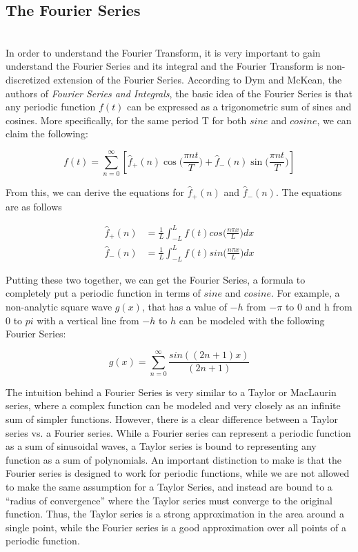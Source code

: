 \documentclass{amsproc}
\begin{document}
\subsection{The Fourier Series}

\mbox{}	\\
\indent In order to understand the Fourier Transform, it is very important to gain understand the Fourier Series and its integral and the Fourier Transform is non-discretized extension of the Fourier Series. According to Dym and McKean, the authors of \textit{Fourier Series and Integrals}, the basic idea of the Fourier Series is that any periodic function $f(t)$ can be expressed as a trigonometric sum of sines and cosines. More specifically, for the same period T for both $sine$ and $cosine$, we can claim the following:

$$
f(t) = \sum_{n = 0}^{\infty} [\hat f_+(n)\cos \Big(\frac{\pi n t}{T}\Big) + \hat f_-(n)\sin \Big(\frac{\pi n t}{T}\Big)]
$$

From this, we can derive the equations for $\hat f_+(n)$ and $\hat f_-(n)$. The equations are as follows \cite{Dym}

\begin{align*}
\hat f_+(n)  &= \frac{1}{L}\int_{-L}^{L} f(t) cos\Big(\frac{n\pi x}{L}\Big)dx \\
\hat f_-(n)  &= \frac{1}{L}\int_{-L}^{L} f(t) sin\Big(\frac{n\pi x}{L}\Big)dx
\end{align*}

Putting these two together, we can get the Fourier Series, a formula to completely put a periodic function in terms of $sine$ and $cosine$. For example, a non-analytic square wave $g(x)$, that has a value of $-h$ from $-\pi$ to $0$ and h from $0$ to $pi$ with a vertical line from $-h$ to $h$ can be modeled with the following Fourier Series:

$$
g(x) = \sum_{n = 0}^{\infty} \frac{sin((2n + 1)x)}{(2n + 1)}
$$

The intuition behind a Fourier Series is very similar to a Taylor or MacLaurin series, where a complex function can be modeled and very closely  as an infinite sum of simpler functions. However, there is a clear difference between a Taylor series vs. a Fourier series. While a Fourier series can represent a periodic function as a sum of sinusoidal waves, a Taylor series is bound to representing any function as a sum of polynomials. An important distinction to make is that the Fourier series is designed to work for periodic functions, while we are not allowed to make the same assumption for a Taylor Series, and instead are bound to a ``radius of convergence'' where the Taylor series must converge to the original function. Thus, the Taylor series is a strong approximation in the area around a single point, while the Fourier series is a good approximation over all points of a periodic function.
\end{document}
